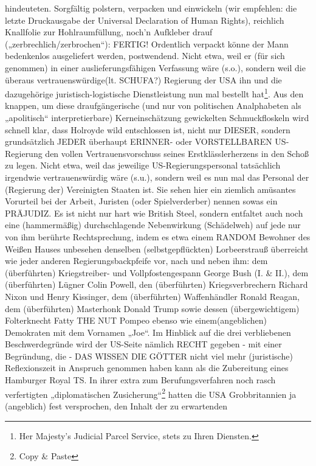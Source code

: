 \begin{multicols}{2}
{hindeuteten. Sorgfältig polstern, verpacken und einwickeln (wir empfehlen: die
letzte Druckausgabe der Universal Declaration of Human Rights), reichlich
Knallfolie zur Hohlraumfüllung, noch’n Aufkleber drauf
(„zerbrechlich/zerbrochen“): FERTIG!\textCR
Ordentlich verpackt könne der Mann bedenkenlos ausgeliefert werden, postwendend.
Nicht etwa, weil er (für sich genommen) in einer auslieferungsfähigen
Verfassung wäre (s.o.), sondern weil die überaus vertrauenswürdige(lt. SCHUFA?)
Regierung der USA ihn und die dazugehörige juristisch-logistische
Dienstleistung nun mal bestellt hat\footnote[29]{Her Majesty’s Judicial Parcel
Service, stets zu Ihren Diensten.}. Aus den knappen, um diese draufgängerische
(und nur von politischen Analphabeten als „apolitisch“ interpretierbare)
Kerneinschätzung gewickelten Schmuckfloskeln wird schnell klar, dass Holroyde
wild entschlossen ist, nicht nur DIESER, sondern grundsätzlich JEDER überhaupt
ERINNER- oder VORSTELLBAREN US-Regierung den vollen Vertrauensvorschuss seines
Erstklässlerherzens in den Schoß zu legen. Nicht etwa, weil das jeweilige
US-Regierungspersonal tatsächlich irgendwie vertrauenswürdig wäre
(s.u.), sondern weil es nun mal das Personal der (Regierung der) Vereinigten
Staaten ist.\textCR
Sie sehen hier ein ziemlich amüsantes Vorurteil bei der Arbeit, Juristen
(oder Spielverderber) nennen sowas ein PRÄJUDIZ. Es ist nicht nur hart wie
British Steel, sondern entfaltet auch noch eine (hammermäßig) durchschlagende
Nebenwirkung (Schädelweh) auf jede nur von ihm berührte Rechtsprechung, indem
es etwa einem RANDOM Bewohner des Weißen Hauses unbesehen denselben
(selbstgepflückten) Lorbeerstrauß überreicht wie jeder anderen
Regierungsbackpfeife vor, nach und neben ihm: dem (überführten) Kriegstreiber-
und Vollpfostengespann George Bush (I. \& II.), dem (überführten) Lügner Colin
Powell, den (überführten) Kriegsverbrechern Richard Nixon und Henry Kissinger,
dem (überführten) Waffenhändler Ronald Reagan, dem (überführten) Masterhonk
Donald Trump sowie dessen (übergewichtigem) Folterknecht Fatty THE NUT Pompeo
ebenso wie einem(angeblichen) Demokraten mit dem Vornamen „Joe“.\textCR
Im Hinblick auf die drei verbliebenen Beschwerdegründe wird der US-Seite nämlich
RECHT gegeben - mit einer Begründung, die - DAS WISSEN DIE GÖTTER nicht viel
mehr (juristische) Reflexionszeit in Anspruch genommen haben kann als die
Zubereitung eines Hamburger Royal TS. In ihrer extra zum Berufungsverfahren
noch rasch verfertigten 
„diplomatischen Zusicherung“\footnote[30]{Copy \& Paste} hatten die USA
 Grobbritannien ja (angeblich) fest versprochen, den Inhalt der zu erwartenden
}
\end{multicols}
